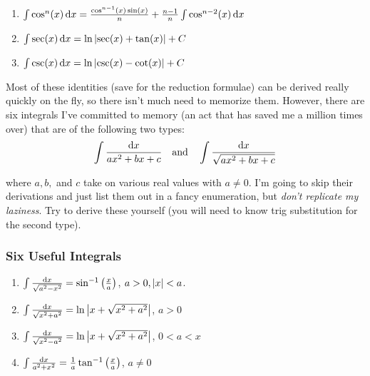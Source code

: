 \documentclass{article}
\begin{document}
{\begin{enumerate}
      \item \(\int \cos^n(x) \, \mathrm{d} x = \frac{\cos^{n-1}(x) \sin(x)}{n} + \frac{n-1}{n} \int \cos^{n-2}(x) \, \mathrm{d} x\)
      
      \item \(\int \sec(x) \, \mathrm{d} x = \ln\left\lvert \sec(x) + \tan(x)\right\rvert + C\)
      
      \item \(\int \csc(x) \, \mathrm{d} x = \ln\left\lvert \csc(x) -\cot(x)\right\rvert + C\)
       
    \end{enumerate}

    Most of these identities (save for the reduction formulae)  can be derived really quickly on the fly, so there isn't much need to memorize them. However, there are six integrals I've committed to memory (an act that has saved me a million times over) that are of the following two types:
    \begin{align*}
      \int \frac{\mathrm{d} x}{ax^2 + bx + c} \quad \text{and} \quad \int \frac{\mathrm{d} x}{\sqrt{ax^2 + bx + c}}
    \end{align*}

    where \(a, b,\) and \(c\) take on various real values with \(a \neq 0\). I'm going to skip their derivations and just list them out in a fancy enumeration, but \emph{don't replicate my laziness}. Try to derive these yourself (you will need to know trig substitution for the second type).

    \subsubsection*{Six Useful Integrals}
    \begin{enumerate}
      \item \(\int \frac{\mathrm{d} x}{\sqrt{a^2-x^2}} = \sin^{-1}\left(\frac{x}{a}\right)\), \hspace*{1cm} \(a > 0, \left\lvert x\right\rvert < a\).
      
      \item \(\int \frac{\mathrm{d} x}{\sqrt{x^2+a^2}} = \ln\left\lvert x + \sqrt{x^2 + a^2}\right\rvert\), \hspace*{1cm} \(a > 0\)
    
      \item \(\int \frac{\mathrm{d} x}{\sqrt{x^2 - a^2}} = \ln\left\lvert x + \sqrt{x^2 + a^2}\right\rvert\), \hspace*{1cm} \(0 < a < x\)
      
      \item \(\int \frac{\mathrm{d} x}{a^2 + x^2} = \frac{1}{a}\tan^{-1}\left(\frac{x}{a}\right)\),\hspace*{1cm} \(a \neq 0\)
      

\end{enumerate}}
\end{document}
